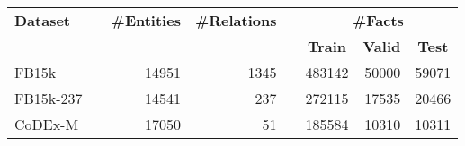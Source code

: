 \begin{tabular}{ l c r r c r r r }
    \toprule

    \multicolumn{1}{l}{\textbf{Dataset}} & \phantom &
    \multicolumn{1}{c}{\textbf{\#Entities}} &
    \multicolumn{1}{c}{\textbf{\#Relations}} & \phantom &
    \multicolumn{3}{c}{\textbf{\#Facts}} \\

    \cmidrule{6-8}

    \multicolumn{1}{c}{} &&
    \multicolumn{1}{c}{} &
    \multicolumn{1}{c}{} &&
    \multicolumn{1}{c}{\textbf{Train}} &
    \multicolumn{1}{c}{\textbf{Valid}} &
    \multicolumn{1}{c}{\textbf{Test}} \\

    \midrule

    FB15k     && \num{14951} & \num{1345} && \num{483142} & \num{50000} & \num{59071} \\
    FB15k-237 && \num{14541} & \num{237}  && \num{272115} & \num{17535} & \num{20466} \\
    CoDEx-M   && \num{17050} & \num{51}   && \num{185584} & \num{10310} & \num{10311} \\

    \bottomrule
\end{tabular}
